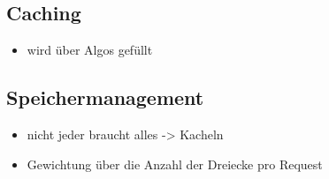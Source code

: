 \subsection{Caching}
\begin{itemize}
 \item wird über Algos gefüllt
\end{itemize}

\subsection{Speichermanagement}
\begin{itemize}
 \item nicht jeder braucht alles -> Kacheln
 \item Gewichtung über die Anzahl der Dreiecke pro Request
\end{itemize}
